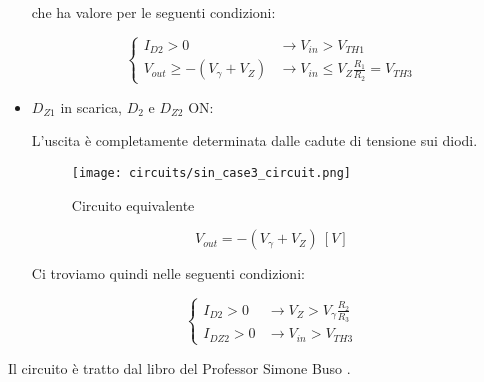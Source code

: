 \begin{itemize}
          che ha valore per le seguenti condizioni:

          \begin{equation}
              \left\{
              \begin{array}{ll}
                  I_{D2}> 0                    & \rightarrow V_{in}>V_{TH1}                        \\
                  V_{out}\geq-(V_{\gamma}+V_Z) & \rightarrow V_{in}\leq V_Z\frac{R_1}{R_2}=V_{TH3}
              \end{array}
              \right.
          \end{equation}

    \item $D_{Z1}$ in scarica, $D_2$ e $D_{Z2}$ ON:

          L'uscita è completamente determinata dalle cadute di tensione sui diodi.

          \begin{minipage}{0.45\textwidth}
              \centering
              \begin{figure}[H]
                  \centering
                  \texttt{[image: circuits/sin\_case3\_circuit.png]}
                  \caption{Circuito equivalente}
                  \label{sin_case3_circuit}
              \end{figure}
          \end{minipage}
          \begin{minipage}{0.45\textwidth}
              \centering
              \begin{equation}
                  V_{out}=-(V_{\gamma}+V_Z)\ [V]
              \end{equation}
          \end{minipage}

          Ci troviamo quindi nelle seguenti condizioni:

          \begin{equation}
              \left\{
              \begin{array}{ll}
                  I_{D2}> 0  & \rightarrow V_Z>V_\gamma\frac{R_2}{R_3} \\
                  I_{DZ2}> 0 & \rightarrow V_{in}>V_{TH3}
              \end{array}
              \right.
          \end{equation}

\end{itemize}

Il circuito è tratto dal libro del Professor Simone Buso \cite{buso}.

